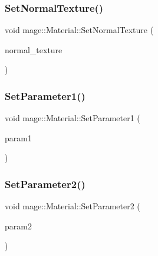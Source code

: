 \hypertarget{structmage_1_1_material_a61b695303632bd8fd1399c63e746319e}{}\label{structmage_1_1_material_a61b695303632bd8fd1399c63e746319e} 
\subsubsection{\texorpdfstring{Set\+Normal\+Texture()}{SetNormalTexture()}}
{\footnotesize\ttfamily void mage\+::\+Material\+::\+Set\+Normal\+Texture (\begin{DoxyParamCaption}\item[{\hyperlink{namespacemage_a1e01ae66713838a7a67d30e44c67703e}{Shared\+Ptr}$<$ \hyperlink{classmage_1_1_texture}{Texture} $>$}]{normal\+\_\+texture }\end{DoxyParamCaption})}

\hypertarget{structmage_1_1_material_a350e145990c73b08e7e2bda2a4255e88}{}\label{structmage_1_1_material_a350e145990c73b08e7e2bda2a4255e88} 
\subsubsection{\texorpdfstring{Set\+Parameter1()}{SetParameter1()}}
{\footnotesize\ttfamily void mage\+::\+Material\+::\+Set\+Parameter1 (\begin{DoxyParamCaption}\item[{float}]{param1 }\end{DoxyParamCaption})\hspace{0.3cm}{\ttfamily [noexcept]}}

\hypertarget{structmage_1_1_material_a7a1f7dbc0b3b3c72e87a3be0c17f825a}{}\label{structmage_1_1_material_a7a1f7dbc0b3b3c72e87a3be0c17f825a} 
\subsubsection{\texorpdfstring{Set\+Parameter2()}{SetParameter2()}}
{\footnotesize\ttfamily void mage\+::\+Material\+::\+Set\+Parameter2 (\begin{DoxyParamCaption}\item[{float}]{param2 }\end{DoxyParamCaption})\hspace{0.3cm}{\ttfamily [noexcept]}}

